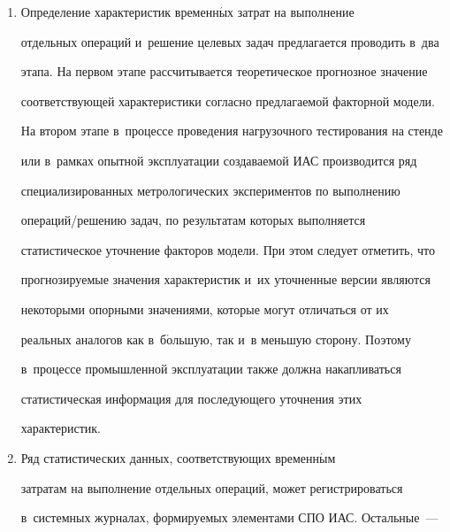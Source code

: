 \begin{enumerate}[1.]
\begin{itemize}
\item особенностей специализированных средств, применяемых в~ИАС, 


например средств обеспечения информационной безопасности~--- 


программных средств аутентификации, средств шифрования сетевого 


трафика, антивирусных программ и~пр.


\end{itemize}


      \item Определение характеристик временн$\acute{\mbox{ы}}$х затрат на выполнение 


отдельных операций и~решение целевых задач предлагается проводить в~два 


этапа. На первом этапе рассчитывается теоретическое прогнозное значение 


соответствующей характеристики согласно предлагаемой факторной модели. 


На втором этапе в~процессе проведения нагрузочного тестирования на стенде 


или в~рамках опытной эксплуатации создаваемой ИАС производится ряд 


специализированных метрологических экспериментов по выполнению  


опе\-ра\-ций/ре\-ше\-нию задач, по результатам которых выполняется 


статистическое уточнение факторов модели. При этом следует отметить, что 


прогно\-зи\-ру\-емые значения характеристик и~их уточненные версии являются 


некоторыми опорными значениями, которые могут отличаться от их 


реальных аналогов как в~б$\acute{\mbox{о}}$льшую, так и~в меньшую сторону. Поэтому 


в~процессе промышленной эксплуатации также должна накапливаться 


статистическая информация для последующего уточнения этих 


характеристик.


      \item Ряд статистических данных, соответствующих временн$\acute{\mbox{ы}}$м 


затратам на выполнение отдельных операций, может регистрироваться 


в~системных журналах, формируемых элементами СПО ИАС. Остальные~--- 



\end{enumerate}
